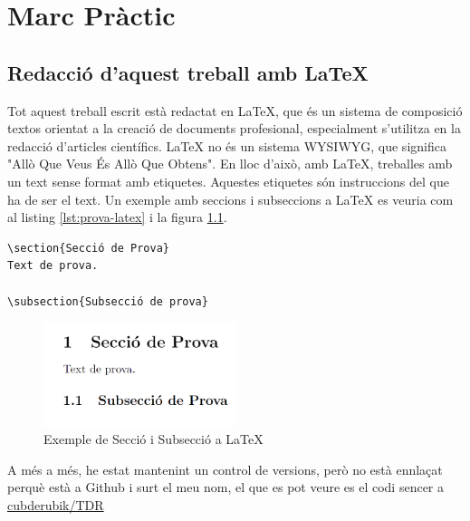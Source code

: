 \part{Marc Pràctic}

\chapter{Redacció d'aquest treball amb \LaTeX}

Tot aquest treball escrit està redactat en LaTeX, que és un sistema de composició textos orientat a la creació de documents profesional, especialment s'utilitza en la redacció d'articles científics.
LaTeX no és un sistema WYSIWYG, que significa "Allò Que Veus És Allò Que Obtens". En lloc d'això, amb LaTeX, treballes amb un text sense format amb etiquetes. Aquestes etiquetes són instruccions del que ha de ser el text.
Un exemple amb seccions i subseccions a LaTeX es veuria com al listing \ref{lst:prova-latex} i la figura \ref{fig:prova-latex}.

\begin{lstlisting}[style=latex, caption={Exemple de Secció i Subsecció a LaTeX}, label={lst:prova-latex}]
\section{Secció de Prova}
Text de prova.

\subsection{Subsecció de prova}

\end{lstlisting}

\begin{figure}[h]
    \centering
    \includegraphics[width=0.5\textwidth]{img/figures/prova-codi-latex.png}
    \caption{Exemple de Secció i Subsecció a LaTeX}
    \label{fig:prova-latex}
\end{figure}


A més a més, he estat mantenint un control de versions, però no està ennlaçat perquè està a Github i surt el meu nom, el que es pot veure es el codi sencer a \href{https://github.com/cubderubik/TdR}{cubderubik/TDR}

